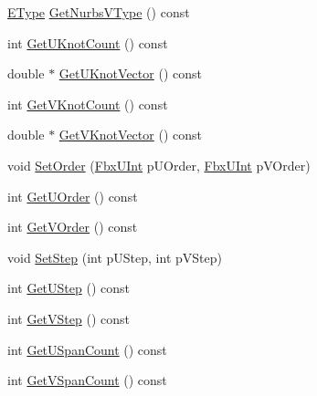 \begin{DoxyCompactItemize}
\hyperlink{class_fbx_nurbs_surface_a87c1fcd98d8fa511ee6c6166346a46b3}{E\+Type} \hyperlink{class_fbx_nurbs_surface_a8e1f509e97a93380853aa0a009aa7a01}{Get\+Nurbs\+V\+Type} () const
\item 
int \hyperlink{class_fbx_nurbs_surface_adc42200550501843d8a31b9a3d895337}{Get\+U\+Knot\+Count} () const
\item 
double $\ast$ \hyperlink{class_fbx_nurbs_surface_a34c4fa7619bbd3293074929f14d1ae42}{Get\+U\+Knot\+Vector} () const
\item 
int \hyperlink{class_fbx_nurbs_surface_aa1776426c0e8b230c302d9c90b0244f9}{Get\+V\+Knot\+Count} () const
\item 
double $\ast$ \hyperlink{class_fbx_nurbs_surface_ac12a9bb5194931ba8be016dd0d309e9f}{Get\+V\+Knot\+Vector} () const
\item 
void \hyperlink{class_fbx_nurbs_surface_ad15927332a22dbd3f1f4ae51418d14c4}{Set\+Order} (\hyperlink{fbxtypes_8h_ae9fb141d8158a730aa85ec5ff2ea3f6b}{Fbx\+U\+Int} p\+U\+Order, \hyperlink{fbxtypes_8h_ae9fb141d8158a730aa85ec5ff2ea3f6b}{Fbx\+U\+Int} p\+V\+Order)
\item 
int \hyperlink{class_fbx_nurbs_surface_ac085e8d245849e5864bf8fd192eeb62e}{Get\+U\+Order} () const
\item 
int \hyperlink{class_fbx_nurbs_surface_a9727565bce4253b1d44e2fcd3a712f7b}{Get\+V\+Order} () const
\item 
void \hyperlink{class_fbx_nurbs_surface_a8da4f135539ccdb54716ea1c2ec0fb89}{Set\+Step} (int p\+U\+Step, int p\+V\+Step)
\item 
int \hyperlink{class_fbx_nurbs_surface_aa726194cee04c25a68b695e5588d62eb}{Get\+U\+Step} () const
\item 
int \hyperlink{class_fbx_nurbs_surface_aa5159d6706750fe43de222b7333b9b7a}{Get\+V\+Step} () const
\item 
int \hyperlink{class_fbx_nurbs_surface_af42bb32cacf0ceb7616db1a28e5b27e1}{Get\+U\+Span\+Count} () const
\item 
int \hyperlink{class_fbx_nurbs_surface_a7ced12d93b7736902f0ca7a8aa968f04}{Get\+V\+Span\+Count} () const
\end{DoxyCompactItemize}
